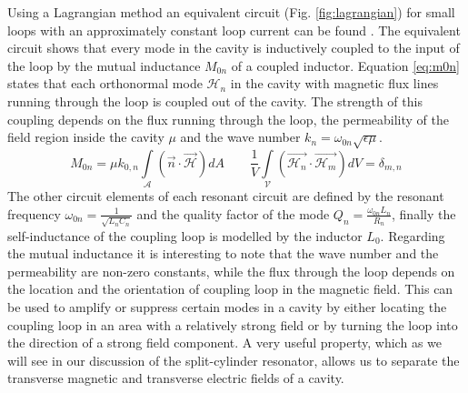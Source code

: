 Using a Lagrangian method an equivalent circuit (Fig. \ref{fig:lagrangian}) for small loops with an approximately constant loop current can be found \cite{mdp}. The equivalent circuit shows that every mode in the cavity is inductively coupled to the input of the loop by the mutual inductance $M_{0n}$ of a coupled inductor. Equation \eqref{eq:m0n} states that each orthonormal mode $\mathcal{H}_n$ in the cavity with magnetic flux lines running through the loop is coupled out of the cavity. The strength of this coupling depends on the flux running through the loop, the permeability of the field region inside the cavity $\mu$ and the wave number $k_n=\omega_{0n}\sqrt{\epsilon\mu}$.
\begin{equation}\label{eq:m0n}
M_{0n}=\mu k_{0,n}\int\limits_{\mathcal{A}}(\vec{n}\cdot\vec{\mathcal{H}}) dA \qquad \frac{1}{V}\int\limits_{\mathcal{V}}(\vec{\mathcal{H}_n}\cdot\vec{\mathcal{H}_m})dV=\delta_{m,n}
\end{equation}
The other circuit elements of each resonant circuit are defined by the resonant frequency $\omega_{0n}=\frac{1}{\sqrt{L_nC_n}}$ and the quality factor of the mode $Q_n=\frac{\omega_{0n}L_n}{R_n}$, finally the self-inductance of the coupling loop is modelled by the inductor $L_0$.
Regarding the mutual inductance it is interesting to note that the wave number and the permeability are non-zero constants, while the flux through the loop depends on the location and the orientation of coupling loop in the magnetic field. This can be used to amplify or suppress certain modes in a cavity by either locating the coupling loop in an area with a relatively strong field or by turning the loop into the direction of a strong field component. A very useful property, which as we will see in our discussion of the split-cylinder resonator, allows us to separate the transverse magnetic and transverse electric fields of a cavity. 


